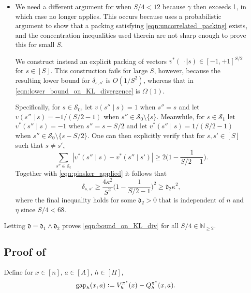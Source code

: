 \documentclass[11pt]{article}
\newcommand{\eqdef}{\vcentcolon=}
\newcommand{\mf}[1]{\mathfrak{#1}}
\newcommand{\mcS}{\mathcal{S}}
\newcommand{\mbbN}{\mathbb{N}}
\newcommand{\gap}{\textnormal{gap}}
\theoremstyle{definition}
\theoremstyle{definition}
\begin{document}
\begin{itemize}
	\item[Case $2\leq\frac{S}{4}< 12$.]
	      We need a different argument for when $S/4<12$ because $\gamma$ then exceeds 1, in which case \cite[Lemma D.6]{jin2020reward} no longer applies.
	      This occurs because \cite[Lemma D.6]{jin2020reward} uses a probabilistic argument to show that a packing satisfying \eqref{eqn:uncorrelated_packing} exists, and the concentration inequalities used therein are not sharp enough to prove this for small $S$.

	      We construct instead an explicit packing of vectors $v^*( \,\cdot\mid  s )\in[-1,+1]^{S/2}$ for $s\in[S]$.
	      This construction fails for large $S$, however, because the resulting lower bound for $\delta_{s,s'}$ is $O(1/S^2)$, whereas that in \eqref{eqn:lower_bound_on_KL_divergence} is $\Omega(1)$.

	      Specifically, for $s\in\mcS_0$, let $v(s'' \mid s)=1$ when $s''=s$ and let $v(s'' \mid s)=-1/(S/2-1)$ when $s''\in \mcS_0\setminus\{s\}$.
	      Meanwhile, for $s\in\mcS_1$ let $v^*(s'' \mid s)=-1$ when $s''=s-S/2$ and let $v^*(s'' \mid s)=1/(S/2-1)$ when $s''\in\mcS_0\setminus\{s-S/2\}$.
	      One can then explicitly verify that for $s,s'\in [S]$ such that $s\neq s'$,
	      \begin{equation}
		      \sum_{s''\in\mcS_0}
		      |v^*(s'' \mid s)-v^*(s'' \mid s')|
		      \geq
		      2\biggl(1-\frac{1}{S/2-1}\biggr)
		      .
	      \end{equation}
	      Together with \eqref{eqn:pinsker_applied} it follows that
	      \begin{equation}
		      \delta_{s,s'}
		      \geq
		      \frac{4\kappa^2}{S^2}
		      \biggl(1-\frac{1}{S/2-1}\biggr)^2
		      \geq
		      \mf{d}_2\kappa^2,
	      \end{equation}
	      where the final inequality holds for some $\mf{d}_2>0$ that is independent of $n$ and $\eta$ since $S/4<68$.
\end{itemize}
Letting $\mf{d}=\mf{d}_1\wedge \mf{d}_2$ proves \eqref{eqn:bound_on_KL_div} for all $S/4\in\mbbN_{\geq 2}$.

\subsection{Proof of \texorpdfstring{}{the regret decomposition for the lower bound}}
\label{sec:proof_of_regret_decomposition_lower_bound}

Define for $x\in[n]$, $a\in[A]$, $h\in[H]$,
\begin{equation}
	\gap_h(x,a)
	\eqdef
	V^{\pi^*}_{h}(x) - Q^{\pi^*}_{h}(x,a)
	.
\end{equation}
\end{document}
